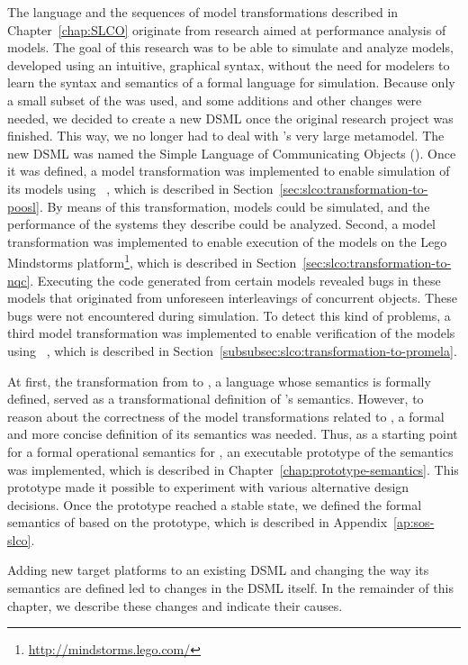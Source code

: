 The language and the sequences of model transformations described in Chapter~\ref{chap:SLCO} originate from research aimed at performance analysis of \UML models.
The goal of this research was to be able to simulate and analyze \UML models, developed using an intuitive, graphical syntax, without the need for modelers to learn the syntax and semantics of a formal language for simulation.
Because only a small subset of the \UML was used, and some additions and other changes were needed, we decided to create a new DSML once the original research project was finished.
This way, we no longer had to deal with \UML's very large metamodel.
The new DSML was named the Simple Language of Communicating Objects (\SLCO).
Once it was defined, a model transformation was implemented to enable simulation of its models using \POOSL~\cite{Theelen2007}, which is described in Section~\ref{sec:slco:transformation-to-poosl}.
By means of this transformation, \SLCO models could be simulated, and the performance of the systems they describe could be analyzed.
Second, a model transformation was implemented to enable execution of the models on the Lego Mindstorms platform\footnote{\url{http://mindstorms.lego.com/}}, which is described in Section~\ref{sec:slco:transformation-to-nqc}.
Executing the code generated from certain models revealed bugs in these models that originated from unforeseen interleavings of concurrent objects.
These bugs were not encountered during simulation.
To detect this kind of problems, a third model transformation was implemented to enable verification of the models using \Spin~\cite{Holzmann2003}, which is described in Section~\ref{subsubsec:slco:transformation-to-promela}.

At first, the transformation from \SLCO to \POOSL, a language whose semantics is formally defined, served as a transformational definition of \SLCO's semantics.
However, to reason about the correctness of the model transformations related to \SLCO, a formal and more concise definition of its semantics was needed.
Thus, as a starting point for a formal operational semantics for \SLCO, an executable prototype of the semantics was implemented, which is described in Chapter~\ref{chap:prototype-semantics}.
This prototype made it possible to experiment with various alternative design decisions.
Once the prototype reached a stable state, we defined the formal semantics of \SLCO based on the prototype, which is described in Appendix~\ref{ap:sos-slco}.

Adding new target platforms to an existing DSML and changing the way its semantics are defined led to changes in the DSML itself.
In the remainder of this chapter, we describe these changes and indicate their causes. 